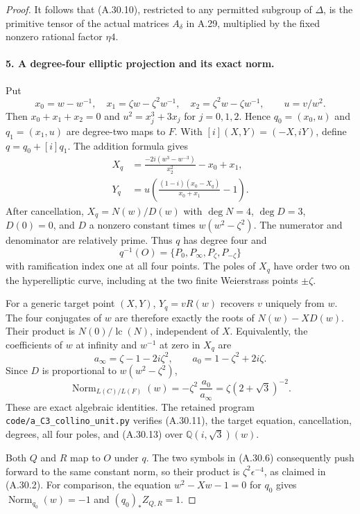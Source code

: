 \begin{proof}
It follows that (A.30.10), restricted to
any permitted subgroup of $\Delta$, is
the primitive tensor of the actual matrices
$A_\delta$ in A.29, multiplied by the
fixed nonzero rational factor $\eta4$.

\paragraph{5. A degree-four elliptic projection and its exact norm.}
Put
\[
 x_0=w-w^{-1},\quad
 x_1=\zeta w-\zeta^2w^{-1},\quad
 x_2=\zeta^2w-\zeta w^{-1},\qquad
 u=v/w^2 .
\]
Then $x_0+x_1+x_2=0$ and
$u^2=x_j^3+3x_j$ for $j=0,1,2$.
Hence $q_0=(x_0,u)$ and $q_1=(x_1,u)$
are degree-two maps to $F$.
With $[i](X,Y)=(-X,iY)$, define
$q=q_0+[i]q_1$. The addition formula gives
\[
 \begin{split}
 X_q&=\frac{-2i(w^3-w^{-3})}{x_2^2}-x_0+x_1,\\
 Y_q&=u\left(\frac{(1-i)(x_0-X_q)}{x_0+x_1}-1\right).
 \end{split}                                             \tag{A.30.11}
\]
After cancellation, $X_q=N(w)/D(w)$ with
$\deg N=4$, $\deg D=3$, $D(0)=0$, and
$D$ a nonzero constant times
$w(w^2-\zeta^2)$. The numerator and denominator
are relatively prime. Thus $q$ has degree
four and
\[
                       q^{-1}(O)
                       =\{P_0,P_\infty,P_\zeta,P_{-\zeta}\}
                                                        \tag{A.30.12}
\]
with ramification index one at all four points.
The poles of $X_q$ have order two on the
hyperelliptic curve, including at the two
finite Weierstrass points $\pm\zeta$.

For a generic target point $(X,Y)$, $Y_q=vR(w)$
recovers $v$ uniquely from $w$. The four conjugates
of $w$ are therefore exactly the roots of
$N(w)-XD(w)$. Their product is
$N(0)/\operatorname{lc}(N)$, independent of $X$.
Equivalently, the coefficients of $w$ at infinity
and $w^{-1}$ at zero in $X_q$ are
\[
          a_\infty=\zeta-1-2i\zeta^2,\qquad
          a_0=1-\zeta^2+2i\zeta .
\]
Since $D$ is proportional to $w(w^2-\zeta^2)$,
\[
 \operatorname{Norm}_{L(C)/L(F)}(w)
       =-\zeta^2\,\frac{a_0}{a_\infty}
       =\zeta(2+\sqrt3)^{-2}.
                                                        \tag{A.30.13}
\]
These are exact algebraic identities.
The retained program \texttt{code/a\_C3\_collino\_unit.py}
verifies (A.30.11), the target equation, cancellation,
degrees, all four poles, and (A.30.13) over
$\mathbb Q(i,\sqrt3)(w)$.

Both $Q$ and $R$ map to $O$ under $q$.
The two symbols in (A.30.6) consequently push
forward to the same constant norm, so their
product is $\zeta^2\epsilon^{-4}$, as claimed
in (A.30.2). For comparison, the equation
$w^2-Xw-1=0$ for $q_0$ gives
$\operatorname{Norm}_{q_0}(w)=-1$ and
$(q_0)_*Z_{Q,R}=1$.


\end{proof}
